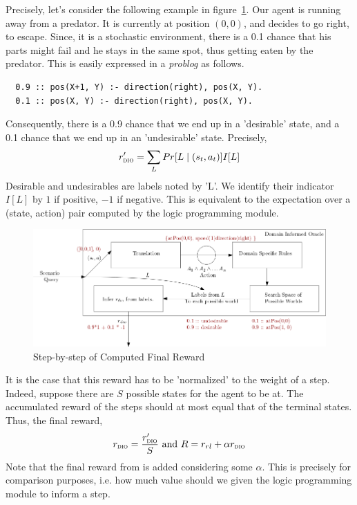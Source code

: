 Precisely, let's consider the following example in figure~\ref{fig:diospecs}.
Our agent is running away from a predator. It is currently at position $(0,0)$, and decides to go right, to escape. 
Since, it is a stochastic environment, there is a 0.1 chance that his parts might fail and he stays in the same spot, thus getting eaten by the predator. 
This is easily expressed in a \emph{problog} as follows. 
\begin{verbatim}
  0.9 :: pos(X+1, Y) :- direction(right), pos(X, Y). 
  0.1 :: pos(X, Y) :- direction(right), pos(X, Y). 
\end{verbatim}
Consequently, there is a 0.9 chance that we end up in a 'desirable' state, and a 0.1 chance that we end up in an 'undesirable' state. Precisely, 
\[ 
   r'_{\textsc{dio}{}} = \sum_{L} Pr[L \mid (s_t, a_t)] I[L]
\] 
Desirable and undesirables are labels noted by 'L'. We identify their indicator $I[L]$ by $1$ if positive, $-1$ if negative.
This is equivalent to the expectation over a (state, action) pair computed by the logic programming module. 
\begin{figure}
  \centering
  \includegraphics[scale=0.45]{figures/diospecs.png}
  \caption{Step-by-step of Computed Final Reward}
  \label{fig:diospecs}
\end{figure}

It is the case that this reward has to be 'normalized' to the weight of a step. Indeed, suppose there are $S$ possible states for the agent to be at. 
The accumulated reward of the steps should at most equal that of the terminal states. Thus, the final reward, 
\[
  r_{\textsc{dio}{}} = \dfrac{r'_{\textsc{dio}{}}}{S} \text{    and    }
  R = r_{rl} + \alpha r_{\textsc{dio}{}}
\] 
Note that the final reward from \dio{} is added considering some $\alpha$. This is precisely for comparison purposes, i.e. how much value should we given the logic programming module 
to inform a step. 

